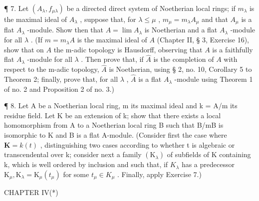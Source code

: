 ¶ 7. Let \((A_{\lambda}, f_{\mu\lambda})\) be a directed direct system of Noetherian local rings; if \(m_{\lambda}\) is the maximal ideal of \(A_{\lambda}\) , suppose that, for \(\lambda \leqslant \mu\) , \(m_{\mu} = m_{\lambda}A_{\mu}\) and that \(A_{\mu}\) is a flat \(A_{\lambda}\) -module. Show then that \(A = \lim A_{\lambda}\) is Noetherian and a flat \(A_{\lambda}\) -module for all \(\lambda\) . (If \(m = m_{\lambda}A\) is the maximal ideal of \(A\) (Chapter II, § 3, Exercise 16), show that on \(A\) the m-adic topology is Hausdorff, observing that \(A\) is a faithfully flat \(A_{\lambda}\) -module for all \(\lambda\) . Then prove that, if \(\hat{A}\) is the completion of \(A\) with respect to the m-adic topology, \(\hat{A}\) is Noetherian, using § 2, no. 10, Corollary 5 to Theorem 2; finally, prove that, for all \(\lambda\) , \(\hat{A}\) is a flat \(A_{\lambda}\) -module using Theorem 1 of no. 2 and Proposition 2 of no. 3.)

¶ 8. Let A be a Noetherian local ring, m its maximal ideal and k = A/m its residue field. Let K be an extension of k; show that there exists a local homomorphism from A to a Noetherian local ring B such that B/mB is isomorphic to K and B is a flat A-module. (Consider first the case where \(\mathbf{K} = k(t)\) , distinguishing two cases according to whether t is algebraic or transcendental over k; consider next a family \((\mathrm{K}_{\lambda})\) of subfields of K containing k, which is well ordered by inclusion and such that, if \(K_{\lambda}\) has a predecessor \(\mathrm{K}_{\mu}, \mathrm{K}_{\lambda} = \mathrm{K}_{\mu}(t_{\mu})\) for some \(t_{\mu} \in K_{\mu}\) . Finally, apply Exercise 7.)

CHAPTER IV(*)

